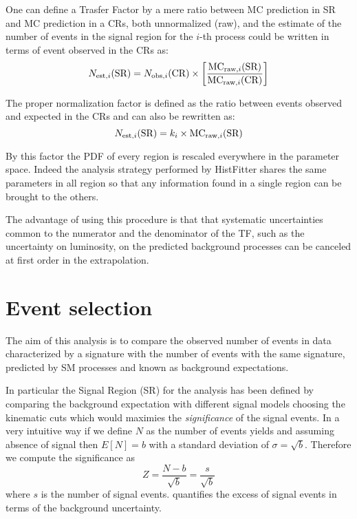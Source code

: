 One can define a Trasfer Factor by a mere ratio between MC prediction in SR and MC prediction in a CRs, both unnormalized (raw), and the estimate of the number of events in the signal region for the $i$-th process could be written in terms of event observed in the CRs as:
\begin{equation}
  \label{eqn:TF}
  N_{\textup{est},i}(\text{SR}) =  N_{\textup{obs},i}({\text{CR}}) \times \left[\frac{\text{MC}_{\textup{raw},i}(\text{SR})}{\text{MC}_{\textup{raw},i}(\text{CR})} \right]
\end{equation}

The proper normalization factor is defined as the ratio between events observed and expected in the CRs and \Eqn{\ref{eqn:TF}} can also be rewritten as:
\begin{equation}
  N_{\textup{est},i}(\text{SR}) = k_{i}\times\text{MC}_{\textup{raw},i}(\text{SR})
\end{equation}

By this factor the PDF of every region is rescaled everywhere in the parameter space. Indeed the analysis strategy performed by HistFitter shares the same parameters in all region so that any information found in a single region can be brought to the others.

The advantage of using this procedure is that that systematic uncertainties common to the numerator and the denominator of the TF, such as the uncertainty on luminosity, on the predicted background processes can be canceled at first order in the extrapolation.

\section{Event selection}
\label{sec:SRselection}
The aim of this analysis is to compare the observed number of events in data characterized by a \mph signature with the number of events with the same signature, predicted by SM processes and known as background expectations.

In particular the Signal Region (SR) for the \mph analysis has been defined by comparing the background expectation with different signal models choosing the kinematic cuts which would maximies the \emph{significance} of the signal events. In a very intuitive way if we define $N$ as the number of events yields and assuming absence of signal then $E[N]=b$ with a standard deviation of $\sigma = \sqrt{b}$. Therefore we compute the significance as
\begin{equation}
  Z=\frac{N-b}{\sqrt{b}}=\frac{s}{\sqrt{b}}
  \label{eqn:significance}
\end{equation}
where $s$ is the number of signal events. \Eqn{\ref{eqn:significance}} quantifies the excess of signal events in terms of the background uncertainty. 


